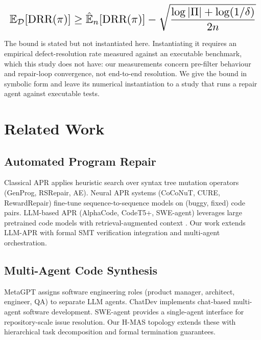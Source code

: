 \documentclass[10pt,twocolumn,letterpaper]{article}
\begin{document}
\begin{equation}
\resizebox{\columnwidth}{!}{$\displaystyle
\begin{aligned}
\mathbb{E}_{\mathcal{D}}[\text{DRR}(\pi)] \geq \hat{\mathbb{E}}_n[\text{DRR}(\pi)] - \sqrt{\frac{\log|\Pi| + \log(1/\delta)}{2n}}
\end{aligned}
$}
\end{equation}

















The bound is stated but not instantiated here. Instantiating it requires an empirical defect-resolution rate measured against an executable benchmark, which this study does not have: our measurements concern pre-filter behaviour and repair-loop convergence, not end-to-end resolution. We give the bound in symbolic form and leave its numerical instantiation to a study that runs a repair agent against executable tests.




\section{Related Work}



\subsection{Automated Program Repair}


Classical APR \cite{arxiv_2010_11146} applies heuristic search over syntax tree mutation operators (GenProg, RSRepair, AE). Neural APR systems (CoCoNuT, CURE, RewardRepair) fine-tune sequence-to-sequence models on (buggy, fixed) code pairs. LLM-based APR (AlphaCode, CodeT5+, SWE-agent) leverages large pretrained code models with retrieval-augmented context \cite{arxiv_2405_01543,arxiv_2501_02497}. Our work extends LLM-APR with formal SMT verification integration and multi-agent orchestration.


\subsection{Multi-Agent Code Synthesis}


MetaGPT \cite{crossref_10_48550_arxiv_2308_00352} assigns software engineering roles (product manager, architect, engineer, QA) to separate LLM agents. ChatDev \cite{crossref_10_18653_v1_2024_acl_long_810} implements chat-based multi-agent software development. SWE-agent \cite{crossref_10_48550_arxiv_2405_15793} provides a single-agent interface for repository-scale issue resolution. Our H-MAS topology extends these with hierarchical task decomposition and formal termination guarantees.
\end{document}
